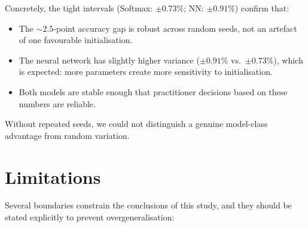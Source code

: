 \documentclass[11pt]{article}
\begin{document}
\begin{enumerate}[leftmargin=2em,itemsep=0.6em]
Concretely, the tight intervals (Softmax: $\pm 0.73\%$; NN: $\pm 0.91\%$) confirm that:
\begin{itemize}[leftmargin=1.4em,itemsep=0.1em]
  \item The ${\sim}2.5$-point accuracy gap is robust across random seeds, not an artefact
        of one favourable initialisation.
  \item The neural network has slightly higher variance ($\pm 0.91\%$ vs.\ $\pm 0.73\%$),
        which is expected: more parameters create more sensitivity to initialisation.
  \item Both models are stable enough that practitioner decisions based on these numbers
        are reliable.
\end{itemize}

Without repeated seeds, we could not distinguish a genuine model-class advantage from
random variation.

\end{enumerate}

\section{Limitations}
\label{sec:limitations}

Several boundaries constrain the conclusions of this study, and they should be stated
explicitly to prevent overgeneralisation:
\end{document}
